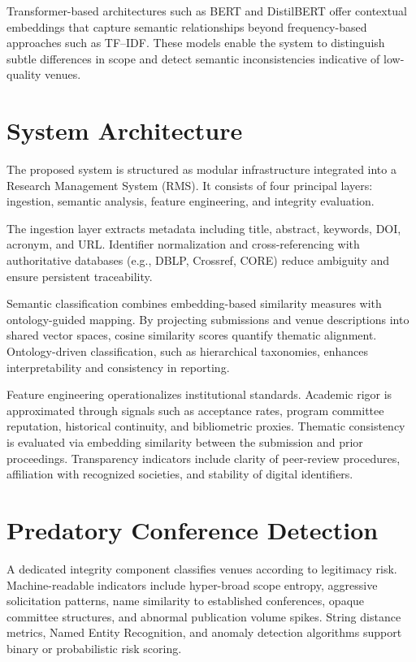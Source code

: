 \documentclass[11pt,a4paper]{article}
\begin{document}
Transformer-based architectures such as BERT and DistilBERT offer contextual embeddings
that capture semantic relationships beyond frequency-based approaches such as TF--IDF.
These models enable the system to distinguish subtle differences in scope and detect
semantic inconsistencies indicative of low-quality venues.

\section{System Architecture}

The proposed system is structured as modular infrastructure integrated into a Research
Management System (RMS). It consists of four principal layers: ingestion, semantic analysis,
feature engineering, and integrity evaluation.

The ingestion layer extracts metadata including title, abstract, keywords, DOI, acronym,
and URL. Identifier normalization and cross-referencing with authoritative databases
(e.g., DBLP, Crossref, CORE) reduce ambiguity and ensure persistent traceability.

Semantic classification combines embedding-based similarity measures with ontology-guided
mapping. By projecting submissions and venue descriptions into shared vector spaces,
cosine similarity scores quantify thematic alignment. Ontology-driven classification,
such as hierarchical taxonomies, enhances interpretability and consistency in reporting.

Feature engineering operationalizes institutional standards. Academic rigor is approximated
through signals such as acceptance rates, program committee reputation, historical continuity,
and bibliometric proxies. Thematic consistency is evaluated via embedding similarity between
the submission and prior proceedings. Transparency indicators include clarity of peer-review
procedures, affiliation with recognized societies, and stability of digital identifiers.

\section{Predatory Conference Detection}

A dedicated integrity component classifies venues according to legitimacy risk. Machine-readable
indicators include hyper-broad scope entropy, aggressive solicitation patterns, name similarity
to established conferences, opaque committee structures, and abnormal publication volume spikes.
String distance metrics, Named Entity Recognition, and anomaly detection algorithms support
binary or probabilistic risk scoring.
\end{document}
